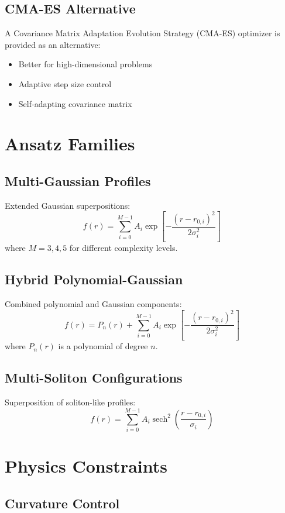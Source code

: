 \documentclass[12pt]{article}
\begin{document}
\subsection{CMA-ES Alternative}

A Covariance Matrix Adaptation Evolution Strategy (CMA-ES) optimizer is provided as an alternative:
\begin{itemize}
\item Better for high-dimensional problems
\item Adaptive step size control
\item Self-adapting covariance matrix
\end{itemize}

\section{Ansatz Families}

\subsection{Multi-Gaussian Profiles}

Extended Gaussian superpositions:
\[
f(r) = \sum_{i=0}^{M-1} A_i \exp\left[-\frac{(r-r_{0,i})^2}{2\sigma_i^2}\right]
\]
where \(M = 3, 4, 5\) for different complexity levels.

\subsection{Hybrid Polynomial-Gaussian}

Combined polynomial and Gaussian components:
\[
f(r) = P_n(r) + \sum_{i=0}^{M-1} A_i \exp\left[-\frac{(r-r_{0,i})^2}{2\sigma_i^2}\right]
\]
where \(P_n(r)\) is a polynomial of degree \(n\).

\subsection{Multi-Soliton Configurations}

Superposition of soliton-like profiles:
\[
f(r) = \sum_{i=0}^{M-1} A_i \operatorname{sech}^2\left(\frac{r-r_{0,i}}{\sigma_i}\right)
\]

\section{Physics Constraints}

\subsection{Curvature Control}
\end{document}
